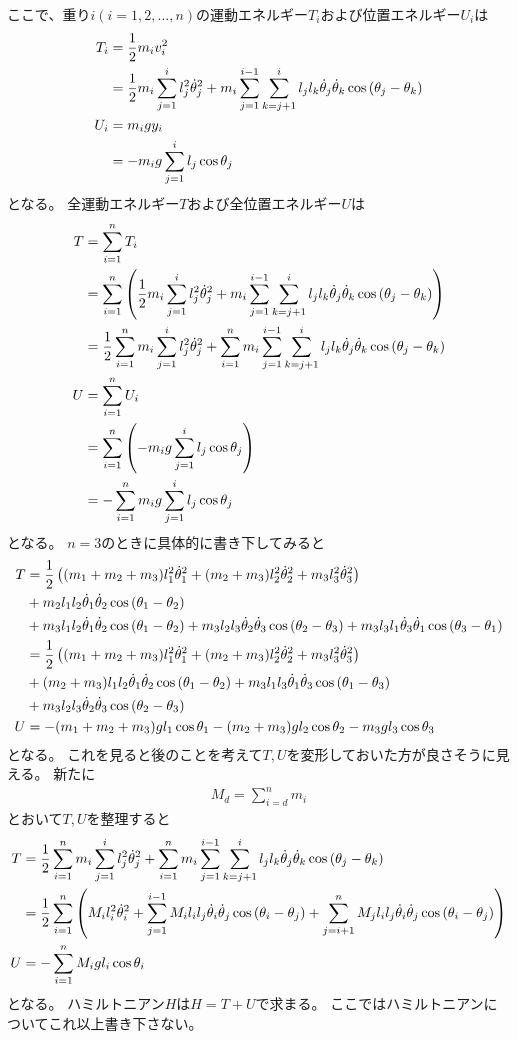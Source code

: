 \documentclass{jsarticle}
\newcommand{\eqa}[1]{\begin{align}#1\end{align}}
\newcommand{\cost}[2]{\cos\left(\theta_{#1}-\theta_{#2}\right)}
\newcommand{\dott}[1]{\dot{\theta}_{#1}}
\begin{document}
ここで、重り$i(i=1,2,\dots,n)$の運動エネルギー$T_i$および位置エネルギー$U_i$は
\eqa{
	T_i &= \frac{1}{2} m_i v_i^2 \notag\\
		&= \frac{1}{2} m_i\sum_{j=1}^i l_j^2 \dott{j}^2
			+ m_i\sum_{j=1}^{i-1} \sum_{k=j+1}^i l_j l_k \dott{j} \dott{k} \cost{j}{k} \\
	U_i &= m_i g y_i \notag\\
		&= -m_i g \sum_{j=1}^i l_j \cos\theta_j
}
となる。
全運動エネルギー$T$および全位置エネルギー$U$は
\eqa{
	T &= \sum_{i=1}^n T_i \notag\\
		&= \sum_{i=1}^n \left( \frac{1}{2} m_i\sum_{j=1}^i l_j^2 \dott{j}^2
			+ m_i\sum_{j=1}^{i-1} \sum_{k=j+1}^i l_j l_k \dott{j} \dott{k} \cost{j}{k} \right) \notag\\
		&= \frac{1}{2} \sum_{i=1}^n m_i \sum_{j=1}^i l_j^2 \dott{j}^2
			+ \sum_{i=1}^n m_i \sum_{j=1}^{i-1} \sum_{k=j+1}^i l_j l_k \dott{j} \dott{k} \cost{j}{k} \\
	U &= \sum_{i=1}^n U_i \notag\\
		&= \sum_{i=1}^n \left(-m_i g \sum_{j=1}^i l_j \cos\theta_j \right) \notag\\
		&= - \sum_{i=1}^n m_i g \sum_{j=1}^i l_j \cos\theta_j
}
となる。
$n=3$のときに具体的に書き下してみると
\eqa{
	T &= \frac{1}{2} \left( (m_1 + m_2 + m_3) l_1^2 \dott{1}^2 + (m_2 + m_3) l_2^2 \dott{2}^2 + m_3 l_3^2 \dott{3}^2 \right) \notag\\
		&+ m_2 l_1 l_2 \dott{1} \dott{2} \cost{1}{2} \notag\\
		&+ m_3 l_1 l_2 \dott{1} \dott{2} \cost{1}{2} + m_3 l_2 l_3 \dott{2} \dott{3} \cost{2}{3} + m_3 l_3 l_1 \dott{3} \dott{1} \cost{3}{1} \notag\\
		&= \frac{1}{2} \left( (m_1 + m_2 + m_3) l_1^2 \dott{1}^2 + (m_2 + m_3) l_2^2 \dott{2}^2 + m_3 l_3^2 \dott{3}^2 \right) \notag\\
		&+ (m_2 + m_3) l_1 l_2 \dott{1} \dott{2} \cost{1}{2} + m_3 l_1 l_3 \dott{1} \dott{3} \cost{1}{3} \notag\\
		&+ m_3 l_2 l_3 \dott{2} \dott{3} \cost{2}{3} \\
	U &= -(m_1 + m_2 + m_3) g l_1 \cos\theta_1 - (m_2 + m_3) g l_2 \cos\theta_2 - m_3 g l_3 \cos\theta_3
}
となる。
これを見ると後のことを考えて$T,U$を変形しておいた方が良さそうに見える。
新たに
\eqa{
	M_d = \sum_{i=d}^n m_i
}
とおいて$T,U$を整理すると
\eqa{
	T &= \frac{1}{2} \sum_{i=1}^n m_i \sum_{j=1}^i l_j^2 \dott{j}^2
			+ \sum_{i=1}^n m_i \sum_{j=1}^{i-1} \sum_{k=j+1}^i l_j l_k \dott{j} \dott{k} \cost{j}{k} \notag\\
		&= \frac{1}{2} \sum_{i=1}^n \left(
			M_i l_i^2 \dott{i}^2
			+ \sum_{j=1}^{i-1} M_i l_i l_j \dott{i} \dott{j} \cost{i}{j}
			+ \sum_{j=i+1}^n M_j l_i l_j \dott{i} \dott{j} \cost{i}{j}
		\right) \label{2D質点系運動エネルギー}\\
	U &= -\sum_{i=1}^n M_i g l_i \cos\theta_i \label{質点系位置エネルギー}
}
となる。
ハミルトニアン$H$は$H=T+U$で求まる。
ここではハミルトニアンについてこれ以上書き下さない。
\end{document}
